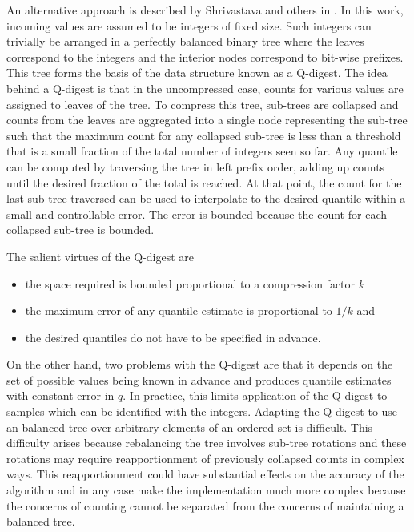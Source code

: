 \documentclass[11pt]{amsart}
\begin{document}
An alternative approach is described by Shrivastava and others in \cite{qdigest}.  In this work, incoming values are assumed to be integers of fixed size. Such integers can trivially be arranged in a perfectly balanced binary tree where the leaves correspond to the integers and the interior nodes correspond to bit-wise prefixes. This tree forms the basis of the data structure known as a Q-digest.  The idea behind a Q-digest is that in the uncompressed case, counts for various values are assigned to leaves of the tree.  To compress this tree, sub-trees are collapsed and counts from the leaves are aggregated into a single node representing the sub-tree such that the maximum count for any collapsed sub-tree is less than a threshold that is a small fraction of the total number of integers seen so far.  Any quantile can be computed by traversing the tree in left prefix order, adding up counts until the desired fraction of the total is reached.  At that point, the count for the last sub-tree traversed can be used to interpolate to the desired quantile within a small and controllable error.  The error is bounded because the count for each collapsed sub-tree is bounded.

The salient virtues of the Q-digest are
\begin{itemize}[nosep, topsep=-10pt]
\item the space required is bounded proportional to a compression factor $k$
\item the maximum error of any quantile estimate is proportional to $1/k$ and
\item the desired quantiles do not have to be specified in advance.
\vspace{10pt}
\end{itemize}

On the other hand, two problems with the Q-digest are that it depends on the set of possible values being known in advance and produces quantile estimates with constant error in $q$. In practice, this limits application of the Q-digest to samples which can be identified with the integers. Adapting the Q-digest to use an balanced tree over arbitrary elements of an ordered set is difficult.  This difficulty arises because rebalancing the tree involves sub-tree rotations and these rotations may require reapportionment of previously collapsed counts in complex ways.  This reapportionment could have substantial effects on the accuracy of the algorithm and in any case make the implementation much more complex because the concerns of counting cannot be separated from the concerns of maintaining a balanced tree.  
\end{document}
